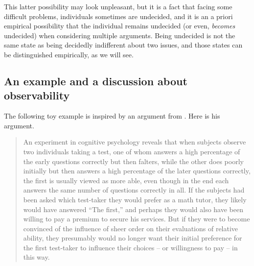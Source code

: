 \documentclass[version=last, pagesize, twoside=off, bibliography=totoc, DIV=calc, fontsize=12pt, a4paper, french, english]{scrartcl}
\begin{document}
This latter possibility may look unpleasant, but it is a fact that facing some difficult problems, individuals sometimes are undecided, and it is an a priori empirical possibility that the individual remains undecided (or even, \emph{becomes} undecided) when considering multiple arguments.
Being undecided is not the same state as being decidedly indifferent about two issues, and those states can be distinguished empirically, as we will see.

\subsection{An example and a discussion about observability}
The following toy example is inspired by an argument from \citet[p.~59]{railton_facts_2003}. Here is his argument.
\begin{quote}
  An experiment in cognitive psychology reveals that when subjects observe two individuals taking a test, one of whom answers a high percentage of the early questions correctly but then falters, while the other does
  poorly initially but then answers a high percentage of the later questions
  correctly, the first is usually viewed as more able, even though in the end
  each answers the same number of questions correctly in all. If the subjects had been asked which test-taker they would prefer as a math tutor,
  they likely would have answered “The first,” and perhaps they would also
  have been willing to pay a premium to secure his services. But if they
  were to become convinced of the influence of sheer order on their evaluations of relative ability, they presumably would no longer want their
  initial preference for the first test-taker to influence their choices – or
  willingness to pay – in this way.
\end{quote}
\end{document}
